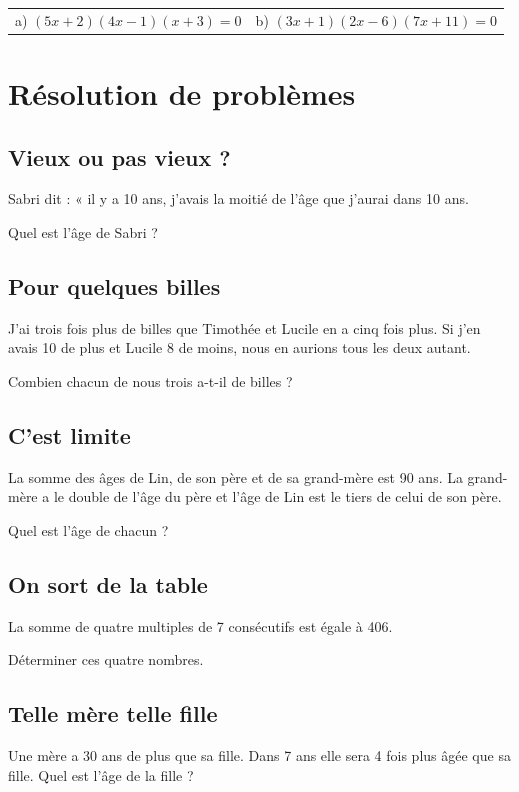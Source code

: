 \documentclass[oneside,12pt]{article}          %
\begin{document}
\begin{tabular}{p{} p{}}
	a) $(5x + 2)(4x - 1)(x + 3) = 0$ & b) $(3x + 1)(2x - 6)(7x + 11) = 0$
\end{tabular}



\section{Résolution de problèmes}

\subsection{Vieux ou pas vieux ?}
Sabri dit : « il y a 10 ans, j’avais la moitié de l’âge que j’aurai dans 10 ans.

Quel est l’âge de Sabri ?



\subsection{Pour quelques billes}
J’ai trois fois plus de billes que Timothée et Lucile en a cinq fois plus. Si j’en avais 10 de plus et
Lucile 8 de moins, nous en aurions tous les deux autant.

Combien chacun de nous trois a-t-il de billes ?



\subsection{C'est limite}
La somme des âges de Lin, de son père et de sa grand-mère est 90 ans. La grand-mère a le double
de l’âge du père et l’âge de Lin est le tiers de celui de son père.

Quel est l’âge de chacun ?



\subsection{On sort de la table}
La somme de quatre multiples de 7 consécutifs est égale à 406.

Déterminer ces quatre nombres.



\subsection{Telle mère telle fille}
Une mère a 30 ans de plus que sa fille. Dans 7 ans elle sera 4 fois plus âgée que sa fille.
Quel est l’âge de la fille ?
\end{document}
